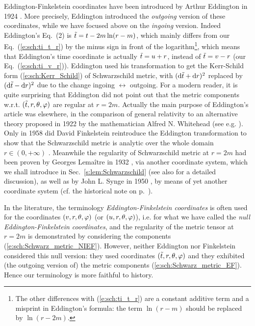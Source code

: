 \begin{hist} \label{n:sch:Eddington_coord}
Eddington-Finkelstein coordinates have been introduced by
Arthur Eddington in 1924 \cite{Eddin1924}. More precisely, Eddington
introduced the \emph{outgoing} version of these coordinates,
while we have focused above on the \emph{ingoing} version. Indeed
Eddington's Eq.~(2) is ${\tilde t} = t - 2m \ln(r-m)$, which mainly differs from
our Eq.~(\ref{e:sch:ti_t_r}) by the minus sign in front of the logarithm\footnote{The other differences with (\ref{e:sch:ti_t_r}) are a constant additive term
and a misprint in Eddington's formula: the term $\ln(r-m)$ should be replaced
by $\ln(r-2m)$.},
which means that Eddington's time coordinate is actually ${\tilde t} = u + r$, instead of
${\tilde t} = v - r$ (our Eq.~(\ref{e:sch:ti_v_r})). Eddington used his transformation
to get the Kerr-Schild form (\ref{e:sch:Kerr_Schild}) of Schwarzschild metric,
with $(\mathrm{d} {\tilde t} + \mathrm{d} r)^2$ replaced by $(\mathrm{d} {\tilde t} - \mathrm{d} r)^2$ due to the change
ingoing $\leftrightarrow$ outgoing. For a modern reader, it is quite surprising
that Eddington did not point out that the metric components w.r.t. $({\tilde t},r,\theta,\varphi)$
are regular at $r=2m$. Actually the main purpose of Eddington's article
\cite{Eddin1924} was elsewhere, in the comparison of general relativity to an alternative theory proposed in 1922 by the mathematician Alfred N. Whitehead
(see e.g. \cite{GibboW08}).
Only in 1958 did David Finkelstein reintroduce the Eddington transformation
to show that the Schwarzschild metric is analytic over the whole domain
$r\in(0,+\infty)$ \cite{Finke58}. Meanwhile the regularity of Schwarzschild metric
at $r=2m$ had been proven by Georges Lemaître in 1932 \cite{Lemai32}, via
another coordinate system, which we shall introduce in
Sec.~\ref{s:lem:Schwarzschild} (see also \cite{Eisen93} for a detailed discussion),
as well as by John L. Synge in 1950 \cite{Synge50}, by means of yet another coordinate
system (cf. the historical note on p.~\pageref{n:max:KS_coord}).
\end{hist}

\begin{remark}
In the literature, the terminology \emph{Eddington-Finkelstein coordinates}
is often used for the coordinates $(v,r,\theta,\varphi)$ (or $(u,r,\theta,\varphi)$),
i.e. for what we have called the \emph{null Eddington-Finkelstein coordinates},
and the regularity of the metric tensor at $r=2m$ is demonstrated by
considering the components (\ref{e:sch:Schwarz_metric_NIEF}).
However, neither
Eddington \cite{Eddin1924} nor Finkelstein \cite{Finke58}
considered this null version: they used coordinates $({\tilde t},r,\theta,\varphi)$
and they exhibited (the outgoing version of) the
metric components (\ref{e:sch:Schwarz_metric_EF}).
Hence our terminology is more faithful to history.
\end{remark}


